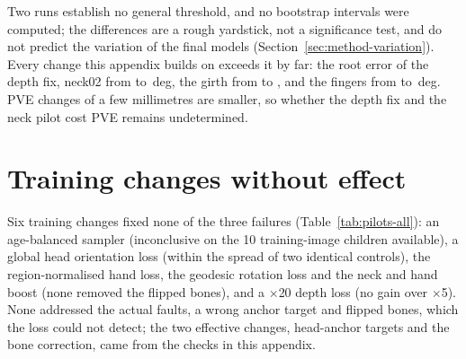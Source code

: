 Two runs establish no general threshold, and no bootstrap intervals were computed; the differences are a rough
yardstick, not a significance test, and do not predict the variation of the final models
(Section~\ref{sec:method-variation}). Every change this appendix builds on exceeds it by far: the root error of the depth fix, neck02 from \DiagNeckTwoBase{} to \DiagNeckTwoNoTrain\,deg, the girth from
\DiagNeckGirthBase{} to \DiagGirthNoTrain, and the fingers from \DiagFingersBase{} to \DiagFingersFixFT\,deg. PVE changes
of a few millimetres are smaller, so whether the depth fix and the neck pilot cost PVE remains undetermined.

\section{Training changes without effect}
\label{sec:diag-negative}

Six training changes fixed none of the three failures (Table~\ref{tab:pilots-all}): an age-balanced sampler
(inconclusive on the 10 training-image children available), a global head orientation loss (within the spread of two
identical controls), the region-normalised hand loss, the geodesic rotation loss and the neck and hand boost (none
removed the flipped bones), and a $\times$20 depth loss (no gain over $\times$5). None addressed the actual faults, a
wrong anchor target and flipped bones, which the loss could not detect; the two effective changes, head-anchor targets
and the bone correction, came from the checks in this appendix.
